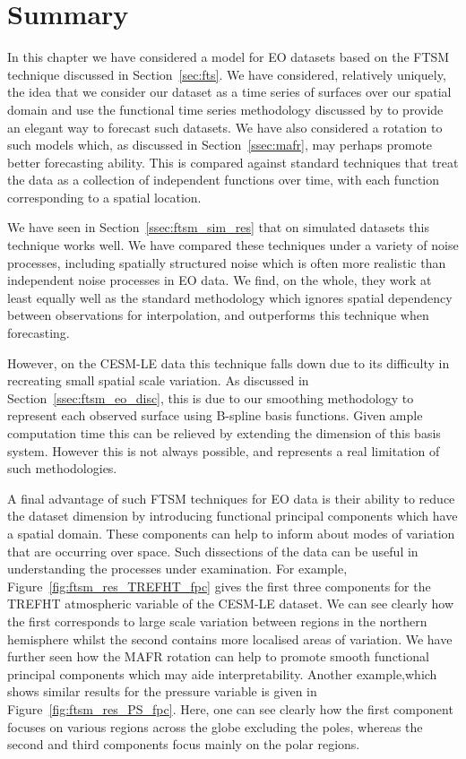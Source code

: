 \section{Summary \label{sec:ftsm_summary}}
In this chapter we have considered a model for EO datasets based on the FTSM technique discussed in Section~\ref{sec:fts}.
We have considered, relatively uniquely, the idea that we consider our dataset as a time series of surfaces over our spatial domain and use the functional time series methodology discussed by \citep{hyndman_forecasting_2009} to provide an elegant way to forecast such datasets.
We have also considered a rotation to such models which, as discussed in Section~\ref{ssec:mafr}, may perhaps promote better forecasting ability.
This is compared against standard techniques that treat the data as a collection of independent functions over time, with each function corresponding to a spatial location. 


We have seen in Section~\ref{ssec:ftsm_sim_res} that on simulated datasets this technique works well.
We have compared these techniques under a variety of noise processes, including spatially structured noise which is often more realistic than independent noise processes in EO data.
We find, on the whole, they work at least equally well as the standard methodology which ignores spatial dependency between observations for interpolation, and outperforms this technique when forecasting.

However, on the CESM-LE data this technique falls down due to its difficulty in recreating small spatial scale variation.
As discussed in Section~\ref{ssec:ftsm_eo_disc}, this is due to our smoothing methodology to represent each observed surface using B-spline basis functions.
Given ample computation time this can be relieved by extending the dimension of this basis system.
However this is not always possible, and represents a real limitation of such methodologies.

A final advantage of such FTSM techniques for EO data is their ability to reduce the dataset dimension by introducing functional principal components which have a spatial domain.
These components can help to inform about modes of variation that are occurring over space.
Such dissections of the data can be useful in understanding the processes under examination. 
For example, Figure~\ref{fig:ftsm_res_TREFHT_fpc} gives the first three components for the TREFHT atmospheric variable of the CESM-LE dataset.
We can see clearly how the first corresponds to large scale variation between regions in the northern hemisphere whilst the second contains more localised areas of variation. 
We have further seen how the MAFR rotation can help to promote smooth functional principal components which may aide interpretability. 
Another example,which shows similar results for the pressure variable is given in Figure~\ref{fig:ftsm_res_PS_fpc}.
Here, one can see clearly how the first component focuses on various regions across the globe excluding the poles, whereas the second and third components focus mainly on the polar regions.

